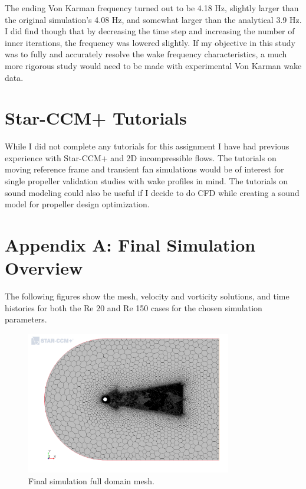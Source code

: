 \documentclass[10pt,english]{article}
\begin{document}
The ending Von Karman frequency turned out to be 4.18 Hz, slightly larger than the original simulation's 4.08 Hz, and somewhat larger than the analytical 3.9 Hz.  I did find though that by decreasing the time step and increasing the number of inner iterations, the frequency was lowered slightly.  If my objective in this study was to fully and accurately resolve the wake frequency characteristics, a much more rigorous study would need to be made with experimental Von Karman wake data.

\section{Star-CCM+ Tutorials}

   While I did not complete any tutorials for this assignment I have had previous experience with Star-CCM+ and 2D incompressible flows.  The tutorials on moving reference frame and transient fan simulations would be of interest for single propeller validation studies with wake profiles in mind.  The tutorials on sound modeling could also be useful if I decide to do CFD while creating a sound model for propeller design optimization.  

\section{Appendix A: Final Simulation Overview}

The following figures show the mesh, velocity and vorticity solutions, and time histories for both the Re 20 and Re 150 cases for the chosen simulation parameters.

 \begin{figure}[h]
\centering
\includegraphics[trim={0.0cm 0cm 0.0cm 0cm},clip,width=0.8\textwidth]{cylinder_2_016_MeshScene2.png}
\vspace{-5pt}
\caption{Final simulation full domain mesh. }
\label{f:cylinder_2_016_MeshScene2}
\end{figure}
\end{document}
